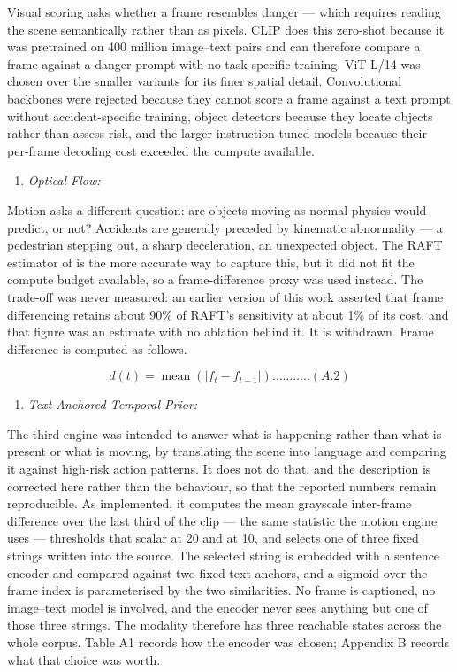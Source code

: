 Visual scoring asks whether a frame resembles danger --- which requires reading the scene semantically rather than as pixels. CLIP does this zero-shot because it was pretrained on 400 million image--text pairs and can therefore compare a frame against a danger prompt with no task-specific training. ViT-L/14 was chosen over the smaller variants for its finer spatial detail. Convolutional backbones were rejected because they cannot score a frame against a text prompt without accident-specific training, object detectors because they locate objects rather than assess risk, and the larger instruction-tuned models because their per-frame decoding cost exceeded the compute available.

\begin{enumerate}
\def\labelenumi{3.\arabic{enumi}}
\setcounter{enumi}{1}
\item
  \emph{Optical Flow:}
\end{enumerate}

Motion asks a different question: are objects moving as normal physics would predict, or not? Accidents are generally preceded by kinematic abnormality --- a pedestrian stepping out, a sharp deceleration, an unexpected object. The RAFT estimator of \citet{teed2020raft} is the more accurate way to capture this, but it did not fit the compute budget available, so a frame-difference proxy was used instead. The trade-off was never measured: an earlier version of this work asserted that frame differencing retains about 90\% of RAFT's sensitivity at about 1\% of its cost, and that figure was an estimate with no ablation behind it. It is withdrawn. Frame difference is computed as follows.

\[d(t) = \operatorname{mean}\left( \left| f_{t} - f_{t-1} \right| \right)\ldots\ldots\ldots..(A.2)\]

\begin{enumerate}
\def\labelenumi{3.\arabic{enumi}}
\setcounter{enumi}{2}
\item
  \emph{Text-Anchored Temporal Prior:}
\end{enumerate}

The third engine was intended to answer what is happening rather than what is present or what is moving, by translating the scene into language and comparing it against high-risk action patterns. It does not do that, and the description is corrected here rather than the behaviour, so that the reported numbers remain reproducible. As implemented, it computes the mean grayscale inter-frame difference over the last third of the clip --- the same statistic the motion engine uses --- thresholds that scalar at 20 and at 10, and selects one of three fixed strings written into the source. The selected string is embedded with a sentence encoder and compared against two fixed text anchors, and a sigmoid over the frame index is parameterised by the two similarities. No frame is captioned, no image--text model is involved, and the encoder never sees anything but one of those three strings. The modality therefore has three reachable states across the whole corpus. Table A1 records how the encoder was chosen; Appendix B records what that choice was worth.

